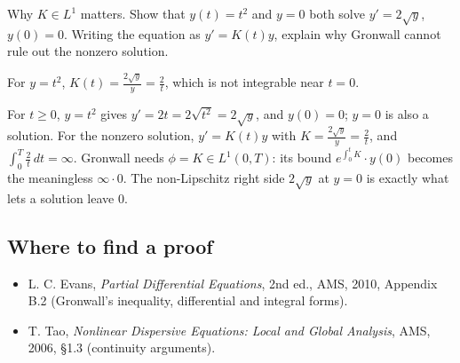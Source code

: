 \begin{exercise}
  Why $K \in L^1$ matters. Show that $y(t) = t^2$ and $y = 0$ both solve $y' = 2\sqrt{y}$, $y(0) = 0$. Writing the equation as $y' = K(t)y$, explain why Gronwall cannot rule out the nonzero solution.
  \begin{hint}
    For $y = t^2$, $K(t) = \frac{2\sqrt{y}}{y} = \frac{2}{t}$, which is not integrable near $t = 0$.
  \end{hint}
  \begin{solution}
    For $t \ge 0$, $y = t^2$ gives $y' = 2t = 2\sqrt{t^2} = 2\sqrt y$, and $y(0) = 0$; $y = 0$ is also a solution. For the nonzero solution, $y' = K(t)y$ with $K = \frac{2\sqrt y}{y} = \frac2t$, and $\int_0^T\frac2t\,dt = \infty$. Gronwall needs $\phi = K \in L^1(0,T)$: its bound $e^{\int_0^tK}\cdot y(0)$ becomes the meaningless $\infty\cdot 0$. The non-Lipschitz right side $2\sqrt y$ at $y = 0$ is exactly what lets a solution leave $0$.
  \end{solution}
\end{exercise}

\subsection*{Where to find a proof}

\begin{itemize}
\item L. C. Evans, \emph{Partial Differential Equations}, 2nd ed., AMS, 2010, Appendix B.2 (Gronwall's inequality, differential and integral forms).
\item T. Tao, \emph{Nonlinear Dispersive Equations: Local and Global Analysis}, AMS, 2006, §1.3 (continuity arguments).
\end{itemize}

